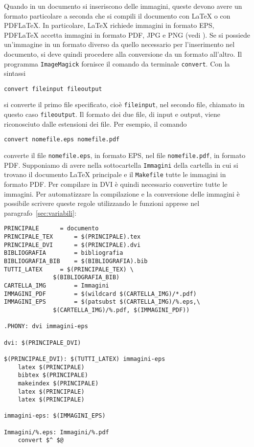 Quando in un documento si inseriscono delle immagini, queste devono avere un
formato particolare a seconda che si compili il documento con \LaTeX{}
o con \textsc{PDF}\LaTeX.  In particolare, \LaTeX{}
richiede immagini in formato \textsc{EPS}, \textsc{PDF}\LaTeX{}
accetta immagini in formato \textsc{PDF}, \textsc{JPG} e \textsc{PNG} (vedi
\textcite[105]{pantieri:latex}).  Se si possiede un'immagine in un formato
diverso da quello necessario per l'inserimento nel documento, si deve quindi
procedere alla conversione da un formato all'altro.  Il programma
\verb|ImageMagick| fornisce il comando da terminale \verb|convert|. Con la
sintassi
\begin{verbatim}
convert fileinput fileoutput
\end{verbatim}
si converte il primo file specificato, cioè \verb|fileinput|, nel secondo file,
chiamato in questo caso \verb|fileoutput|.  Il formato dei due file, di input e
output, viene riconosciuto dalle estensioni dei file.  Per esempio, il comando
\begin{verbatim}
convert nomefile.eps nomefile.pdf
\end{verbatim}
converte il file \verb|nomefile.eps|, in formato \textsc{EPS}, nel file
\verb|nomefile.pdf|, in formato \textsc{PDF}.  Supponiamo di avere nella
sottocartella \verb|Immagini| della cartella in cui si trovano il documento
\LaTeX{}
principale e il \verb|Makefile| tutte le immagini in formato \textsc{PDF}.  Per
compilare in \textsc{DVI} è quindi necessario convertire tutte le immagini.  Per
automatizzare la compilazione e la conversione delle immagini è possibile
scrivere queste regole utilizzando le funzioni apprese nel
paragrafo~\ref{sec:variabili}:
\begin{lstlisting}[caption={\texttt{Makefile} in cui le immagini \textsc{PDF}
vengono convertite in \textsc{EPS} nella compilazione con \LaTeX.},label=lst:pdf-eps]
PRINCIPALE 		= documento
PRINCIPALE_TEX		= $(PRINCIPALE).tex
PRINCIPALE_DVI		= $(PRINCIPALE).dvi
BIBLIOGRAFIA		= bibliografia
BIBLIOGRAFIA_BIB	= $(BIBLIOGRAFIA).bib
TUTTI_LATEX		= $(PRINCIPALE_TEX) \
			  $(BIBLIOGRAFIA_BIB)
CARTELLA_IMG		= Immagini
IMMAGINI_PDF		= $(wildcard $(CARTELLA_IMG)/*.pdf)
IMMAGINI_EPS		= $(patsubst $(CARTELLA_IMG)/%.eps,\
			  $(CARTELLA_IMG)/%.pdf, $(IMMAGINI_PDF))

.PHONY: dvi immagini-eps

dvi: $(PRINCIPALE_DVI)

$(PRINCIPALE_DVI): $(TUTTI_LATEX) immagini-eps
	latex $(PRINCIPALE)
	bibtex $(PRINCIPALE)
	makeindex $(PRINCIPALE)
	latex $(PRINCIPALE)
	latex $(PRINCIPALE)

immagini-eps: $(IMMAGINI_EPS)

Immagini/%.eps: Immagini/%.pdf
	convert $^ $@
\end{lstlisting}
